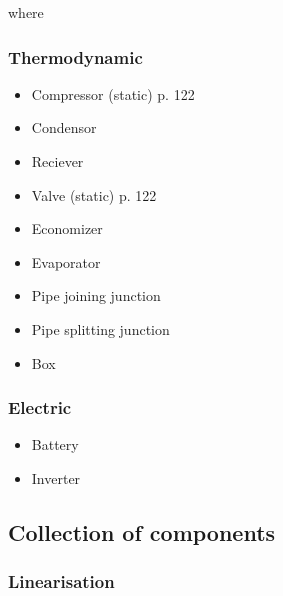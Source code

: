 where


\subsubsection{Thermodynamic}

\begin{itemize}
	\item Compressor (static) \cite{Sorensen2013} p. 122
	\item Condensor
	\item Reciever
	\item Valve (static) \cite{Sorensen2013} p. 122
	\item Economizer
	\item Evaporator
	\item Pipe joining junction
	\item Pipe splitting junction
	\item Box
\end{itemize}

\subsubsection{Electric}

\begin{itemize}
	\item Battery
	\item Inverter
\end{itemize}

\subsection{Collection of components}

\subsubsection{Linearisation}
